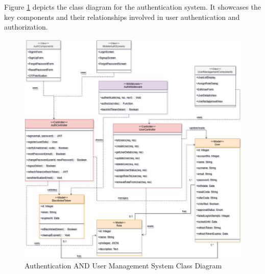 Figure \ref{fig:auth-class-diagram} depicts the class diagram for the authentication system. It showcases the key components and their relationships involved in user authentication and authorization.
\newpage
\begin{figure}[htbp]
    \centering
    \includegraphics[width=1\textwidth]{images/auth_classdiag.PNG}
    \caption{Authentication AND User Management System Class Diagram}
    \label{fig:auth-class-diagram}
\end{figure}


